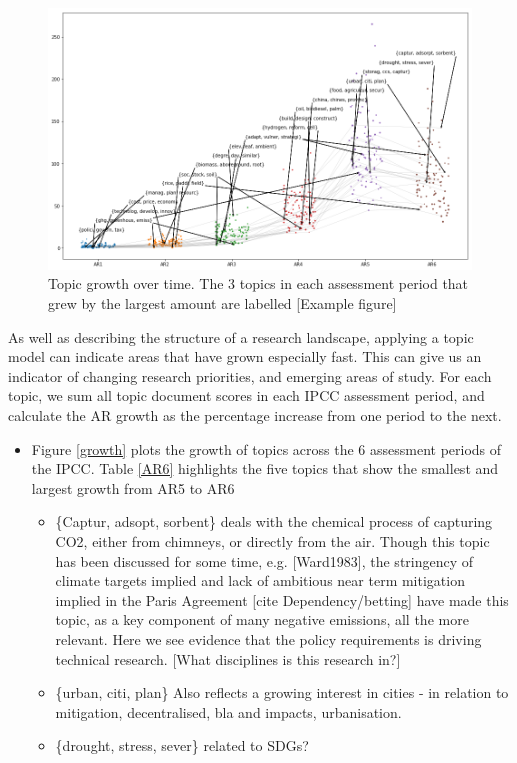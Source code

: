 \documentclass{article}
\begin{document}
\begin{figure}
	\includegraphics[width=\linewidth]{plots/hot_topics_65}
	\caption{Topic growth over time. The 3 topics in each assessment period that grew by the largest amount are labelled [Example figure]}
	\label{topic_growth}
\end{figure}

As well as describing the structure of a research landscape, applying a topic model can indicate areas that have grown especially fast. This can give us an indicator of changing research priorities, and emerging areas of study. For each topic, we sum all topic document scores in each IPCC assessment period, and calculate the AR growth as the percentage increase from one period to the next.

\begin{itemize}
	\item Figure \ref{growth} plots the growth of topics across the 6 assessment periods of the IPCC. Table \ref{AR6} highlights the five topics that show the smallest and largest growth from AR5 to AR6
	\begin{itemize}
		\item \{Captur, adsopt, sorbent\} deals with the chemical process of capturing CO2, either from chimneys, or directly from the air. Though this topic has been discussed for some time, e.g. [Ward1983], the stringency of climate targets implied and lack of ambitious near term mitigation implied in the Paris Agreement [cite Dependency/betting] have made this topic, as a key component of many negative emissions, all the more relevant. Here we see evidence that the policy requirements is driving technical research. [What disciplines is this research in?]
		\item \{urban, citi, plan\} Also reflects a growing interest in cities  - in relation to mitigation, decentralised, bla and impacts, urbanisation.
		\item \{drought, stress, sever\} related to SDGs?
	\end{itemize}
\end{itemize}
\end{document}
